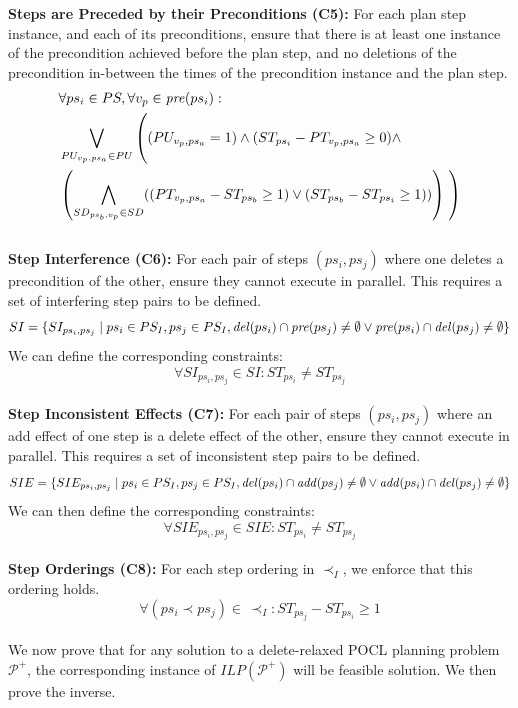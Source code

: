 \textbf{Steps are Preceded by their Preconditions (C5):} For each plan step instance, and each of its preconditions, ensure that there is at least one instance of the precondition achieved before the plan step, and no deletions of the precondition in-between the times of the precondition instance and the plan step.
\begin{align*}
&\forall ps_i\in PS, \forall v_p\in\Pre (ps_i):\\
&\bigvee_{PU_{v_p,ps_a}\in PU}\left(\vphantom{\bigwedge_{SD_{ps_b,v_p}\in SD}}(PU_{v_p,ps_a}=1)\wedge (ST_{ps_i}-PT_{v_p,ps_a}\geq 0)\wedge\right.\\
&\left(\bigwedge_{SD_{ps_b,v_p}\in SD}((PT_{v_p,ps_a}-ST_{ps_b}\geq 1)\vee(ST_{ps_b}-ST_{ps_i}\geq 1))\right)\left.\vphantom{\bigwedge_{SD_{ps_b,v_p}\in SD}}\right)
\end{align*}\\


\textbf{Step Interference (C6):} For each pair of steps $(ps_i,ps_j)$ where one deletes a precondition of the other, ensure they cannot execute in parallel. This requires a set of interfering step pairs to be defined.
\[SI=\{SI_{ps_i,ps_j}\mid ps_i\in PS_I, ps_j\in PS_I, \mathit{del} (ps_i)\cap \mathit{pre} (ps_j)\neq \emptyset \vee \mathit{pre} (ps_i)\cap \mathit{del} (ps_j)\neq \emptyset\}\]
We can define the corresponding constraints:
\[ \forall SI_{ps_i,ps_j}\in SI:ST_{ps_i}\neq ST_{ps_j}\]\\


\textbf{Step Inconsistent Effects (C7):} For each pair of steps $(ps_i,ps_j)$ where an add effect of one step is a delete effect of the other, ensure they cannot execute in parallel. This requires a set of inconsistent step pairs to be defined.
\[SIE=\{SIE_{ps_i,ps_j}\mid ps_i\in PS_I, ps_j\in PS_I, \mathit{del} (ps_i)\cap \mathit{add} (ps_j)\neq \emptyset \vee \mathit{add} (ps_i)\cap \mathit{del} (ps_j)\neq \emptyset\}\]
We can then define the corresponding constraints:
\[ \forall SIE_{ps_i,ps_j}\in SIE:ST_{ps_i}\neq ST_{ps_j}\]\\


\textbf{Step Orderings (C8):} For each step ordering in $\prec _I$, we enforce that this ordering holds.
\[ \forall( ps_i\prec ps_j)\in\,\prec_I: ST_{ps_j}-ST_{ps_i}\geq 1\]\\


We now prove that for any solution to a delete-relaxed POCL planning problem $\mathcal{P}^+$, the corresponding instance of $\mathit{ILP}(\mathcal{P}^+)$ will be feasible solution. We then prove the inverse.\\


